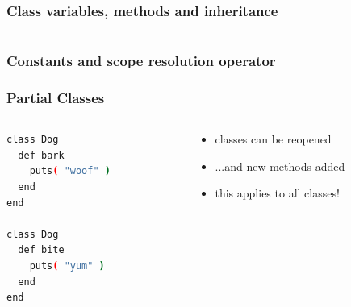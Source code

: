 \begin{frame}[fragile]\frametitle{Class variables, methods and inheritance}
\begin{columns}[c] 

\begin{column}{5.2cm}

\end{column}
\pause
\begin{column}{5.5cm}


\end{column}

\end{columns}


\end{frame}






\begin{frame}[fragile]\frametitle{Constants and scope resolution operator}

\end{frame}






\begin{frame}[fragile]\frametitle{Partial Classes}

\begin{columns}[c] 

\begin{column}{5.5cm}
\begin{lstlisting}[language=bash]
class Dog
  def bark
    puts( "woof" )
  end
end

class Dog
  def bite
    puts( "yum" )
  end
end

\end{lstlisting}
\end{column}
\pause
\begin{column}{5.5cm}

\begin{itemize}
\item classes can be reopened
\item ...and new methods added
\item this applies to all classes!
\end{itemize}

\end{column}

\end{columns}

\end{frame}






